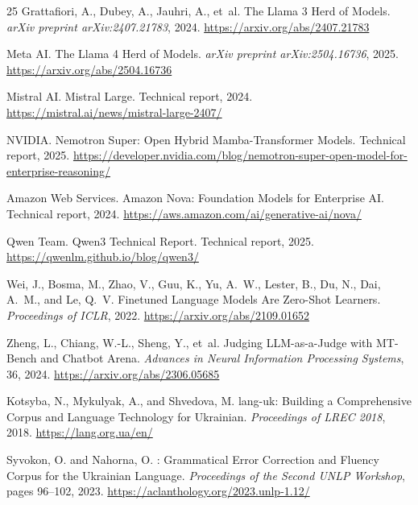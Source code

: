 \documentclass[11pt,a4paper]{article}
\begin{document}
\begin{thebibliography}{25}
Grattafiori, A., Dubey, A., Jauhri, A., et~al.
\newblock The Llama 3 Herd of Models.
\newblock \emph{arXiv preprint arXiv:2407.21783}, 2024.
\newblock \url{https://arxiv.org/abs/2407.21783}

{Meta AI}.
\newblock The Llama 4 Herd of Models.
\newblock \emph{arXiv preprint arXiv:2504.16736}, 2025.
\newblock \url{https://arxiv.org/abs/2504.16736}

{Mistral AI}.
\newblock Mistral Large.
\newblock Technical report, 2024.
\newblock \url{https://mistral.ai/news/mistral-large-2407/}

{NVIDIA}.
\newblock Nemotron Super: Open Hybrid Mamba-Transformer Models.
\newblock Technical report, 2025.
\newblock \url{https://developer.nvidia.com/blog/nemotron-super-open-model-for-enterprise-reasoning/}

{Amazon Web Services}.
\newblock Amazon Nova: Foundation Models for Enterprise AI.
\newblock Technical report, 2024.
\newblock \url{https://aws.amazon.com/ai/generative-ai/nova/}

{Qwen Team}.
\newblock Qwen3 Technical Report.
\newblock Technical report, 2025.
\newblock \url{https://qwenlm.github.io/blog/qwen3/}

Wei, J., Bosma, M., Zhao, V., Guu, K., Yu, A.~W., Lester, B., Du, N., Dai, A.~M., and Le, Q.~V.
\newblock Finetuned Language Models Are Zero-Shot Learners.
\newblock \emph{Proceedings of ICLR}, 2022.
\newblock \url{https://arxiv.org/abs/2109.01652}

Zheng, L., Chiang, W.-L., Sheng, Y., et~al.
\newblock Judging LLM-as-a-Judge with MT-Bench and Chatbot Arena.
\newblock \emph{Advances in Neural Information Processing Systems}, 36, 2024.
\newblock \url{https://arxiv.org/abs/2306.05685}

Kotsyba, N., Mykulyak, A., and Shvedova, M.
\newblock lang-uk: Building a Comprehensive Corpus and Language Technology for Ukrainian.
\newblock \emph{Proceedings of LREC 2018}, 2018.
\newblock \url{https://lang.org.ua/en/}

Syvokon, O. and Nahorna, O.
: Grammatical Error Correction and Fluency Corpus for the Ukrainian Language.
\newblock \emph{Proceedings of the Second UNLP Workshop}, pages 96--102, 2023.
\newblock \url{https://aclanthology.org/2023.unlp-1.12/}


\end{thebibliography}
\end{document}
